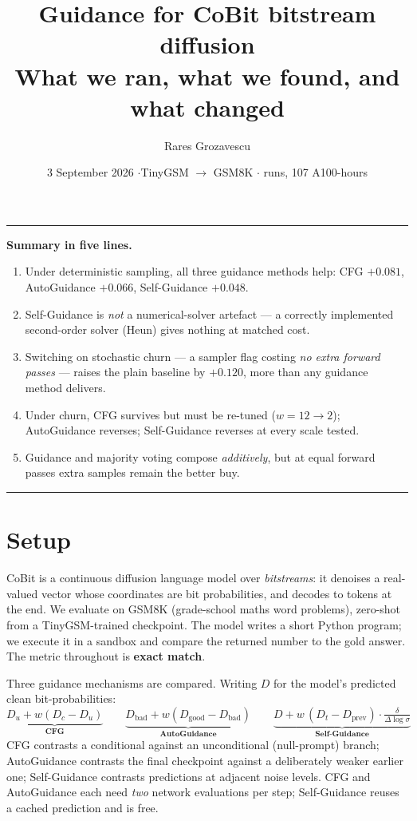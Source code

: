 \documentclass[11pt,a4paper]{article}
\title{\vspace{-1.6cm}\textbf{Guidance for CoBit bitstream diffusion}\\[2pt]
\large What we ran, what we found, and what changed}
\author{\normalsize Rares Grozavescu}
\date{\normalsize 3 September 2026 \quad$\cdot$\quad TinyGSM $\rightarrow$ GSM8K \quad$\cdot$\quad 329 runs, 107 A100-hours}
\begin{document}
\maketitle\vspace{-0.6cm}

\hrule\vspace{6pt}
\textbf{Summary in five lines.}
\begin{enumerate}\itemsep1pt
\item Under deterministic sampling, all three guidance methods help: CFG $+0.081$, AutoGuidance $+0.066$, Self-Guidance $+0.048$.
\item Self-Guidance is \emph{not} a numerical-solver artefact --- a correctly implemented second-order solver (Heun) gives nothing at matched cost.
\item Switching on stochastic churn --- a sampler flag costing \emph{no extra forward passes} --- raises the plain baseline by $+0.120$, more than any guidance method delivers.
\item Under churn, CFG survives but must be re-tuned ($w{=}12\rightarrow2$); AutoGuidance reverses; Self-Guidance reverses at every scale tested.
\item Guidance and majority voting compose \emph{additively}, but at equal forward passes extra samples remain the better buy.
\end{enumerate}
\vspace{2pt}\hrule

\section{Setup}
CoBit is a continuous diffusion language model over \emph{bitstreams}: it denoises a real-valued vector whose coordinates are bit probabilities, and decodes to tokens at the end. We evaluate on GSM8K (grade-school maths word problems), zero-shot from a TinyGSM-trained checkpoint. The model writes a short Python program; we execute it in a sandbox and compare the returned number to the gold answer. The metric throughout is \textbf{exact match}.

Three guidance mechanisms are compared. Writing $D$ for the model's predicted clean bit-probabilities:
\[
\underbrace{D_u + w(D_c-D_u)}_{\textbf{CFG}}\qquad
\underbrace{D_{\text{bad}} + w(D_{\text{good}}-D_{\text{bad}})}_{\textbf{AutoGuidance}}\qquad
\underbrace{D + w\,(D_t - D_{\text{prev}})\cdot\tfrac{\delta}{\Delta\log\sigma}}_{\textbf{Self-Guidance}}
\]
CFG contrasts a conditional against an unconditional (null-prompt) branch; AutoGuidance contrasts the final checkpoint against a deliberately weaker earlier one; Self-Guidance contrasts predictions at adjacent noise levels. CFG and AutoGuidance each need \emph{two} network evaluations per step; Self-Guidance reuses a cached prediction and is free.
\end{document}
